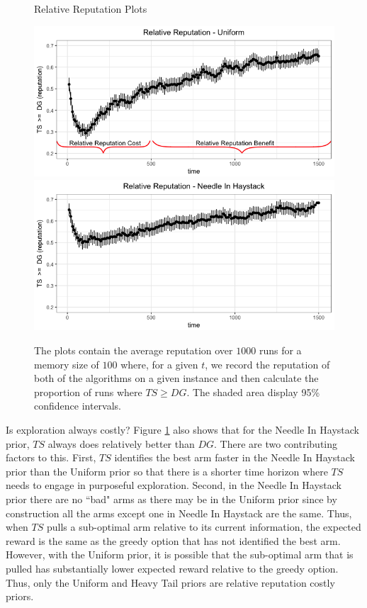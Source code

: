 \documentclass{article}
\theoremstyle{definition}
\begin{document}
\begin{figure}
\caption{Relative Reputation Plots}
\includegraphics[scale=0.35]{figures/relative_uniform_annotated_plot}
\includegraphics[scale=0.35]{figures/ts_dg_nih_10_prelim}
\caption*{\tiny{The plots contain the average reputation over $1000$ runs for a memory size of $100$ where, for a given $t$, we record the reputation of both of the algorithms on a given instance and then calculate the proportion of runs where $TS \geq DG$. The shaded area display 95\% confidence intervals.}}
\label{relative_rep_plots}

\end{figure}

Is exploration always costly? Figure \ref{relative_rep_plots} also shows that for the Needle In Haystack prior, $TS$ always does relatively better than $DG$. There are two contributing factors to this. First, $TS$ identifies the best arm faster in the Needle In Haystack prior than the Uniform prior so that there is a shorter time horizon where $TS$ needs to engage in purposeful exploration. Second, in the Needle In Haystack prior there are no ``bad" arms as there may be in the Uniform prior since by construction all the arms except one in Needle In Haystack are the same. Thus, when $TS$ pulls a sub-optimal arm relative to its current information, the expected reward is the same as the greedy option that has not identified the best arm. However, with the Uniform prior, it is possible that the sub-optimal arm that is pulled has substantially lower expected reward relative to the greedy option. Thus, only the Uniform and Heavy Tail priors are relative reputation costly priors.
\end{document}
